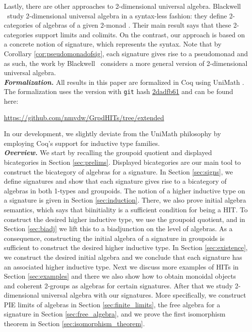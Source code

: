 Lastly, there are other approaches to 2-dimensional universal algebra.
Blackwell \etal \ study 2-dimensional universal algebra in a syntax-less fashion: they define 2-categories of algebras of a given 2-monad \cite{blackwell1989two}.
Their main result says that these 2-categories support limits and colimits.
On the contrast, our approach is based on a concrete notion of signature, which represents the syntax.
Note that by Corollary \ref{cor:pseudomonadofsig}, each signature gives rise to a pseudomonad and as such, the work by Blackwell \etal \ considers a more general version of 2-dimensional universal algebra.
\\
\emph{\textbf{Formalization.}}
All results in this paper are formalized in Coq \cite{Coq:manual} using UniMath \cite{UniMath}.
The formalization uses the version with \texttt{git} hash \href{https://github.com/UniMath/UniMath/tree/2dadfb61f5ef0d9805cf0eb6b80ef2beb26472d5}{2dadfb61} and can be found here:
\begin{center}
\url{https://github.com/nmvdw/GrpdHITs/tree/extended}
\end{center}
In our development, we slightly deviate from the UniMath philosophy by employing Coq's support for inductive type families.
\\
\emph{\textbf{Overview.}}
We start by recalling the groupoid quotient and displayed bicategories in Section \ref{sec:prelims}.
Displayed bicategories are our main tool to construct the bicategory of algebras for a signature.
In Section \ref{sec:signs}, we define signatures and show that each signature gives rise to a bicategory of algebras in both 1-types and groupoids.
The notion of a higher inductive type on a signature is given in Section \ref{sec:induction}.
There, we also prove initial algebra semantics, which says that biinitiality is a sufficient condition for being a HIT.
To construct the desired higher inductive type, we use the groupoid quotient, and in Section \ref{sec:biadj} we lift this to a biadjunction on the level of algebras.
As a consequence, constructing the initial algebra of a signature in groupoids is sufficient to construct the desired higher inductive type.
In Section \ref{sec:existence}, we construct the desired initial algebra and we conclude that each signature has an associated higher inductive type. 
Next we discuss more examples of HITs in Section \ref{sec:examples} and there we also show how to obtain monoidal objects and coherent 2-groups as algebras for certain signatures.
After that we study 2-dimensional universal algebra with our signatures.
More specifically, we construct PIE limits of algebras in Section \ref{sec:finite_limits}, the free algebra for a signature in Section \ref{sec:free_algebra}, and we prove the first isomorphism theorem in Section \ref{sec:isomorphism_theorem}.
